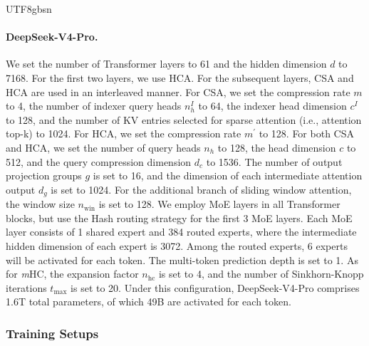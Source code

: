 \documentclass[11pt, a4paper, logo, copyright, nonumbering]{deepseek}
\newcommand{\dsvivp}{DeepSeek-V4-Pro}
\newcommand{\dsvivptp}{1.6T}
\newcommand{\dsvivpap}{49B}
\newcommand{\mhc}{\textit{m}HC}
\newcommand{\hca}{HCA}
\newcommand{\csa}{CSA}
\begin{document}
\begin{CJK*}{UTF8}{gbsn}
\paragraph{\dsvivp{}.}
We set the number of Transformer layers to 61 and the hidden dimension $d$ to 7168. 
For the first two layers, we use \hca{}. 
For the subsequent layers, \csa{} and \hca{} are used in an interleaved manner.
For \csa{}, we set the compression rate $m$ to 4, the number of indexer query heads $n_h^I$ to 64, the indexer head dimension $c^I$ to 128, and the number of KV entries selected for sparse attention (i.e., attention top-k) to 1024.  
For \hca{}, we set the compression rate $m^{\prime}$ to 128. 
For both \csa{} and \hca{}, we set the number of query heads $n_h$ to 128, the head dimension $c$ to 512, and the query compression dimension $d_c$ to 1536. 
The number of output projection groups $g$ is set to 16, and the dimension of each intermediate attention output $d_g$ is set to 1024.
For the additional branch of sliding window attention, the window size $n_{\text{win}}$ is set to 128. 
We employ MoE layers in all Transformer blocks, but use the Hash routing strategy for the first 3 MoE layers. 
Each MoE layer consists of 1 shared expert and 384 routed experts, where the intermediate hidden dimension of each expert is 3072. 
Among the routed experts, 6 experts will be activated for each token. 
The multi-token prediction depth is set to 1. 
As for \mhc{}, the expansion factor $n_{\text{hc}}$ is set to 4, and the number of Sinkhorn-Knopp iterations $t_{\text{max}}$ is set to 20. 
Under this configuration, \dsvivp{} comprises \dsvivptp{} total parameters, of which \dsvivpap{} are activated for each token. 

\subsubsection{Training Setups}


\end{CJK*}
\end{document}
